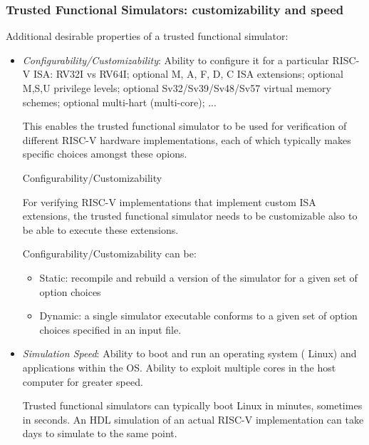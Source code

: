 \begin{frame}[fragile]
\frametitle{Trusted Functional Simulators: customizability and speed}

\footnotesize

Additional desirable properties of a trusted functional simulator:
\begin{itemize}

  \item \emph{Configurability/Customizability}: Ability to configure
    it for a particular RISC-V ISA: RV32I vs RV64I; optional M, A, F,
    D, C ISA extensions; optional M,S,U privilege levels; optional
    Sv32/Sv39/Sv48/Sv57 virtual memory schemes; optional multi-hart
    (multi-core); ...

    \vx

    This enables the trusted functional simulator to be used for
    verification of different RISC-V hardware implementations, each of
    which typically makes specific choices amongst these opions.

    \vx

    Configurability/Customizability 

    \vx

    For verifying RISC-V implementations that implement custom ISA
    extensions, the trusted functional simulator needs to be
    customizable also to be able to execute these extensions.

    \vx

    Configurability/Customizability can be:

    \begin{itemize}\scriptsize

      \item Static: recompile and rebuild a version of the simulator
        for a given set of option choices

      \item Dynamic: a single simulator executable conforms to a given
        set of option choices specified in an input file.

    \end{itemize}

  \vxx

  \item \emph{Simulation Speed}: Ability to boot and run an operating
    system ({\eg} Linux) and applications within the OS.  Ability to
    exploit multiple cores in the host computer for greater speed.

    \vx
    Trusted functional simulators can typically boot Linux in minutes,
    sometimes in seconds.  An HDL simulation of an actual RISC-V
    implementation can take days to simulate to the same point.

\end{itemize}

\end{frame}

